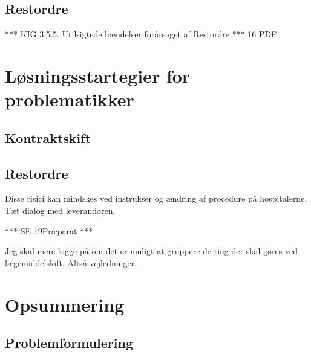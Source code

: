 \subsection{Restordre}

*** KIG 3.5.5. Utilsigtede hændelser forårsaget af Restordre *** 16 PDF

\section{Løsningsstartegier for problematikker}

\subsection{Kontraktskift}

\subsection{Restordre}
Disse risici kan mindskes ved instrukser og ændring af procedure på hospitalerne.
Tæt dialog med leverandøren.

*** SE 19Præparat ***

Jeg skal mere kigge på om det er muligt at gruppere de ting der skal gøres ved lægemiddelskift. Altså vejledninger. 


\section{Opsummering}
\subsection{Problemformulering}